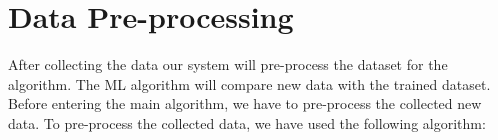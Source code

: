 








\section{Data Pre-processing}
After collecting the data our system will pre-process the dataset for the algorithm. The ML algorithm will compare new data with the trained dataset. Before entering the main algorithm, we have to pre-process the collected new data. To pre-process the collected data, we have used the following algorithm:

